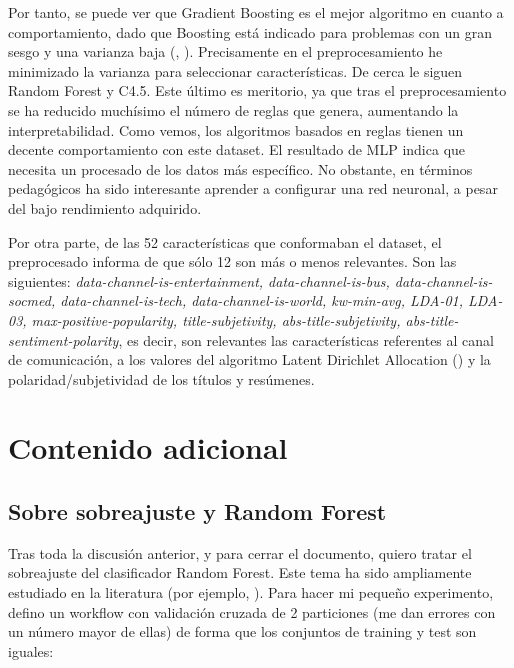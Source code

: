 Por tanto, se puede ver que Gradient Boosting es el mejor algoritmo en cuanto a comportamiento, dado que Boosting está indicado para problemas con un gran sesgo y una varianza baja (\cite{gb}, \cite{gb1}). Precisamente en el preprocesamiento he minimizado la varianza para seleccionar características. De cerca le siguen Random Forest y C4.5. Este último es meritorio, ya que tras el preprocesamiento se ha reducido muchísimo el número de reglas que genera, aumentando la interpretabilidad. Como vemos, los algoritmos basados en reglas tienen un decente comportamiento con este dataset. El resultado de MLP indica que necesita un procesado de los datos más específico. No obstante, en términos pedagógicos ha sido interesante aprender a configurar una red neuronal, a pesar del bajo rendimiento adquirido. 


Por otra parte, de las 52 características que conformaban el dataset, el preprocesado informa de que sólo 12 son más o menos relevantes. Son las siguientes: \textit{data-channel-is-entertainment, data-channel-is-bus, data-channel-is-socmed, data-channel-is-tech, data-channel-is-world, kw-min-avg, LDA-01, LDA-03, max-positive-popularity, title-subjetivity, abs-title-subjetivity, abs-title-sentiment-polarity}, es decir, son relevantes las características referentes al canal de comunicación, a los valores del algoritmo Latent Dirichlet Allocation (\cite{lda}) y la polaridad/subjetividad de los títulos y resúmenes. 


\newpage

\section{Contenido adicional}

\subsection{Sobre sobreajuste y Random Forest}
Tras toda la discusión anterior, y para cerrar el documento, quiero tratar el sobreajuste del clasificador Random Forest. Este tema ha sido ampliamente estudiado en la literatura (por ejemplo, \cite{Breiman2001}). Para hacer mi pequeño experimento, defino un workflow con validación cruzada de 2 particiones (me dan errores con un número mayor de ellas) de forma que los conjuntos de training y test son iguales:

